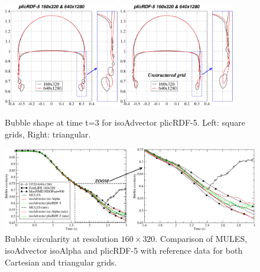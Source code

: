 \documentclass[review]{elsarticle}
\begin{document}
\begin{figure}[!h]
\begin{center}
 \includegraphics[width=0.45\textwidth]{figures/bubble_shape_t=3_plicRDF5-struct.pdf}
 \hspace{2mm}
 \includegraphics[width=0.45\textwidth]{figures/bubble_shape_t=3_plicRDF5-uns.pdf}
 \vspace{-6mm}
\end{center}
\caption{Bubble shape at time t=3 for isoAdvector plicRDF-5. Left: square grids, Right: triangular.}
\label{fig:HB_bubble_shape_3_plicRDF5}
\end{figure}


\begin{figure}[!h]
  \includegraphics[width=\textwidth]{figures/HysingB_bubble_circularity_160x320.pdf}
  \caption{Bubble circularity at resolution $160\times320$. Comparison of MULES, isoAdvector isoAlpha and plicRDF-5 with reference data for both Cartesian and triangular grids.}
  \label{fig:HB_bubble_circularity160}
\end{figure}
\end{document}
